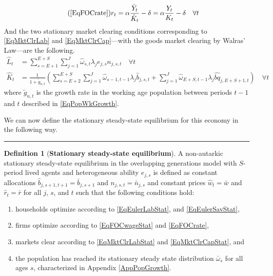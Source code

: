 \documentclass[letterpaper,12pt]{article}
\theoremstyle{definition}
\newtheorem{definition}{Definition} %
\begin{document}
\begin{spacing}{1.5}
    \begin{equation}\tag{\ref{EqFOCrate}}
       r_t = \alpha\frac{\hat{Y}_t}{\hat{K}_t} - \delta = \alpha\frac{Y_t}{K_t} - \delta \quad \forall t
    \end{equation}
    And the two stationary market clearing conditions corresponding to \eqref{EqMktClrLab} and \eqref{EqMktClrCap}---with the goods market clearing by Walras' Law---are the following.
    \begin{align}
      \hat{L}_t &= \sum_{s=E+1}^{E+S}\sum_{j=1}^{J} \hat{\omega}_{s,t}\lambda_j e_{j,s}n_{j,s,t} \quad \forall t \label{EqMktClrLabStat} \\
      \hat{K}_t &= \frac{1}{1 + \tilde{g}_{n,t}}\left(\sum_{s=E+2}^{E+S}\sum_{j=1}^{J}\hat{\omega}_{s-1,t-1}\lambda_j \hat{b}_{j,s,t} + \sum_{j=1}^{J}\hat{\omega}_{E+S,t-1}\lambda_j \hat{bq}_{j,E+S+1,t}\right) \quad \forall t \label{EqMktClrCapStat}
    \end{align}
    where $\tilde{g}_{n,t}$ is the growth rate in the working age population between periods $t-1$ and $t$ described in \eqref{EqPopWkGrowth}.

    We can now define the stationary steady-state equilibrium for this economy in the following way.

    \vspace{7mm}
    \end{spacing}
    \hrule
    \begin{definition}[\textbf{Stationary steady-state equilibrium}]\label{DefEquilSS}
      A non-autarkic stationary steady-state equilibrium in the overlapping generations model with $S$-period lived agents and heterogeneous ability $e_{j,s}$ is defined as constant allocations $\hat{b}_{j,s+1,t+1}=\bar{b}_{j,s+1}$ and $\hat{n}_{j,s,t}=\bar{n}_{j,s}$ and constant prices $\hat{w}_t=\bar{w}$ and $\hat{r}_t=\bar{r}$ for all $j$, $s$, and $t$ such that the following conditions hold:
       \begin{enumerate}
          \item households optimize according to \eqref{EqEulerLabStat}, and \eqref{EqEulerSavStat},
          \item firms optimize according to \eqref{EqFOCwageStat} and \eqref{EqFOCrate},
          \item markets clear according to \eqref{EqMktClrLabStat} and \eqref{EqMktClrCapStat}, and
          \item the population has reached its stationary steady state distribution $\bar{\omega}_s$ for all ages $s$, characterized in Appendix \ref{AppPopGrowth}.
       \end{enumerate}
    \end{definition}
\end{document}
